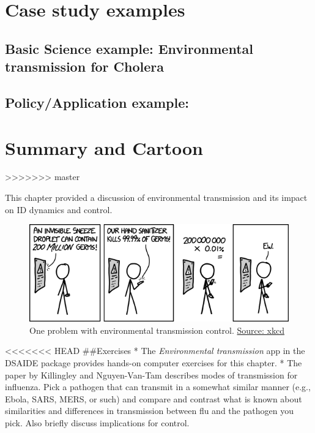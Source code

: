 \documentclass[]{book}
\theoremstyle{definition}
\theoremstyle{definition}
\theoremstyle{definition}
\theoremstyle{remark}
\begin{document}
\section{Case study examples}\label{case-study-examples-1}

\subsection{Basic Science example: Environmental transmission for
Cholera}\label{basic-science-example-environmental-transmission-for-cholera}

\subsection{Policy/Application
example:}\label{policyapplication-example}

\section{Summary and Cartoon}\label{summary-and-cartoon-6}
>>>>>>> master

This chapter provided a discussion of environmental transmission and its
impact on ID dynamics and control.

\begin{figure}
\centering
\includegraphics{./images/xkcd-hand_sanitizer.png}
\caption{One problem with environmental transmission control.
\href{https://xkcd.com/1161/}{Source: xkcd}}
\end{figure}

<<<<<<< HEAD
\#\#Exercises * The \emph{Environmental transmission} app in the DSAIDE
package provides hands-on computer exercises for this chapter. * The
paper by Killingley and Nguyen-Van-Tam describes modes of transmission
for influenza. Pick a pathogen that can transmit in a somewhat similar
manner (e.g., Ebola, SARS, MERS, or such) and compare and contrast what
is known about similarities and differences in transmission between flu
and the pathogen you pick. Also briefly discuss implications for
control.
\end{document}
